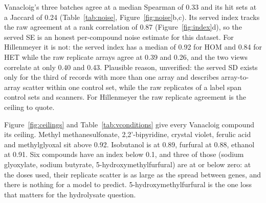 Vanacloig's three batches agree at a median Spearman of 0.33 and its hit sets at a
Jaccard of 0.24 (Table~\ref{tab:noise}, Figure~\ref{fig:noise}b,c). Its served index
tracks the raw agreement at a rank correlation of 0.87 (Figure~\ref{fig:index}d), so
the served SE is an honest per-compound noise estimate for this dataset. For Hillenmeyer
it is not: the served index has a median of 0.92 for HOM and 0.84 for HET while the
raw replicate arrays agree at 0.39 and 0.26, and the two views correlate at only 0.40
and 0.43. Plausible reason, unverified: the served SD exists only for the third of
records with more than one array and describes array-to-array scatter within one
control set, while the raw replicates of a label span control sets and scanners. For
Hillenmeyer the raw replicate agreement is the ceiling to quote.



Figure~\ref{fig:ceilings} and Table~\ref{tab:vconditions} give every Vanacloig compound
its ceiling. Methyl methanesulfonate, 2,2'-bipyridine, crystal violet, ferulic acid and
methylglyoxal sit above 0.92. Isobutanol is at 0.89, furfural at 0.88, ethanol at 0.91.
Six compounds have an index below 0.1, and three of those (sodium glyoxylate, sodium
butyrate, 5-hydroxymethylfurfural) are at or below zero: at the doses used, their
replicate scatter is as large as the spread between genes, and there is nothing for a
model to predict. 5-hydroxymethylfurfural is the one loss that matters for the
hydrolysate question.

